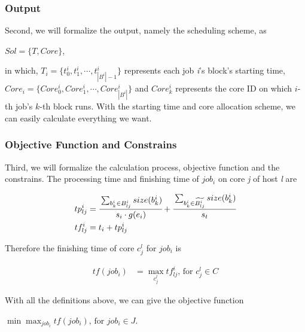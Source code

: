 \documentclass{article}
\begin{document}
    \subsubsection{Output}
        Second, we will formalize the output, namely the scheduling scheme, as
        
        \begin{center}
            $Sol = \{T,Core\}$,
        \end{center}
        
    in which, $T_i=\{t_0^i,t_1^i,\cdots,t_{|B^i|-1}^i\}$ represents each job \textit{i}'s block's starting time, \\  $Core_i = \{Core^i_0,Core^i_1,\cdots,Core^i_{|B^i|}\}$ and $Core^i_k$ represents the core ID on which $i$-th job's $k$-th block runs. With the starting time and core allocation scheme, we can easily calculate everything we want.
    
        \subsubsection{Objective Function and Constrains}
        Third, we will formalize the calculation process, objective function and the constrains. The processing time and finishing time of $job_i$ on core \textit{j} of host \textit{l} are
        
        \begin{center}
        $$
        \begin{aligned}
            tp^i_{lj} &= \cfrac{\sum_{b^i_k \in B^i_{lj}} size(b^i_k)}{s_i \cdot g(e_i)}+\cfrac{\sum_{b^i_k \in \widetilde{B^i_{lj}}} size(b^i_k)}{s_t}\\
            tf^i_{lj} &= t_i + tp^i_{lj}
        \end{aligned}
        $$
        \end{center}
        
        Therefore the finishing time of  core $c_j^l$ for $job_i$ is
        
        \begin{center}
        $$
        \begin{aligned}
        tf(job_i) &= \max_{c_j^l} tf^i_{lj}\text{, for } c_j^l \in C
        \end{aligned}
        $$
        \end{center}
        
        With all the definitions above, we can give the objective function
        
        \begin{center}
            $\min \max_{job_i} tf(job_i)\text{, for } job_i \in J$.
        \end{center}
        
\end{document}
